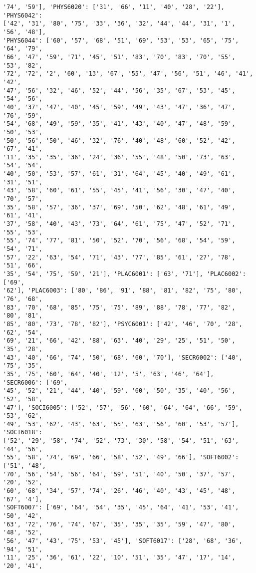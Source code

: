 \documentclass[11pt]{article}
\begin{document}
\begin{Verbatim}[commandchars=\\\{\}]
'74', '59'], 'PHYS6020': ['31', '66', '11', '40', '28', '22'], 'PHYS6042':
['42', '31', '80', '75', '33', '36', '32', '44', '44', '31', '1', '56', '48'],
'PHYS6044': ['60', '57', '68', '51', '69', '53', '53', '65', '75', '64', '79',
'66', '47', '59', '71', '45', '51', '83', '70', '83', '70', '55', '53', '82',
'72', '72', '2', '60', '13', '67', '55', '47', '56', '51', '46', '41', '42',
'47', '56', '32', '46', '52', '44', '56', '35', '67', '53', '45', '54', '56',
'40', '37', '47', '40', '45', '59', '49', '43', '47', '36', '47', '76', '59',
'54', '68', '49', '59', '35', '41', '43', '40', '47', '48', '59', '50', '53',
'50', '56', '50', '46', '32', '76', '40', '48', '60', '52', '42', '67', '41',
'11', '35', '35', '36', '24', '36', '55', '48', '50', '73', '63', '54', '54',
'40', '50', '53', '57', '61', '31', '64', '45', '40', '49', '61', '31', '51',
'43', '58', '60', '61', '55', '45', '41', '56', '30', '47', '40', '70', '57',
'35', '58', '57', '36', '37', '69', '50', '62', '48', '61', '49', '61', '41',
'37', '58', '40', '43', '73', '64', '61', '75', '47', '52', '71', '55', '53',
'55', '74', '77', '81', '50', '52', '70', '56', '68', '54', '59', '54', '71',
'57', '22', '63', '54', '71', '43', '77', '85', '61', '27', '78', '51', '66',
'35', '54', '75', '59', '21'], 'PLAC6001': ['63', '71'], 'PLAC6002': ['69',
'62'], 'PLAC6003': ['80', '86', '91', '88', '81', '82', '75', '80', '76', '68',
'83', '70', '68', '85', '75', '75', '89', '88', '78', '77', '82', '80', '81',
'85', '80', '73', '78', '82'], 'PSYC6001': ['42', '46', '70', '28', '62', '54',
'69', '21', '66', '42', '88', '63', '40', '29', '25', '51', '50', '35', '28',
'43', '40', '66', '74', '50', '68', '60', '70'], 'SECR6002': ['40', '75', '35',
'35', '75', '60', '64', '40', '12', '5', '63', '46', '64'], 'SECR6006': ['69',
'45', '52', '21', '44', '40', '59', '60', '50', '35', '40', '56', '52', '58',
'47'], 'SOCI6005': ['52', '57', '56', '60', '64', '64', '66', '59', '53', '62',
'49', '53', '62', '43', '63', '55', '63', '56', '60', '53', '57'], 'SOCI6018':
['52', '29', '58', '74', '52', '73', '30', '58', '54', '51', '63', '44', '56',
'55', '58', '74', '69', '66', '58', '52', '49', '66'], 'SOFT6002': ['51', '48',
'70', '56', '54', '56', '64', '59', '51', '40', '50', '37', '57', '20', '52',
'60', '68', '34', '57', '74', '26', '46', '40', '43', '45', '48', '67', '4'],
'SOFT6007': ['69', '64', '54', '35', '45', '64', '41', '53', '41', '50', '42',
'63', '72', '76', '74', '67', '35', '35', '35', '59', '47', '80', '48', '52',
'56', '47', '43', '75', '53', '45'], 'SOFT6017': ['28', '68', '36', '94', '51',
'11', '25', '36', '61', '22', '10', '51', '35', '47', '17', '14', '20', '41',

\end{Verbatim}
\end{document}

